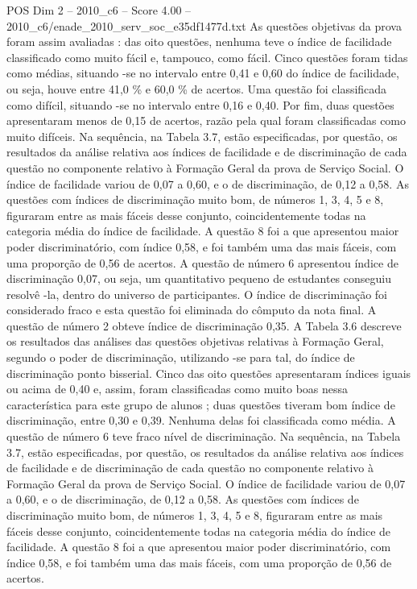 \begin{textsample}{POS Dim 2 – 2010\_c6 – Score 4.00 – 2010\_c6/enade\_2010\_serv\_soc\_e35df1477d.txt}
As questões objetivas da prova foram assim avaliadas : das oito questões, nenhuma teve o índice de facilidade classificado como muito fácil e, tampouco, como fácil.
Cinco questões foram tidas como médias, situando -se no intervalo entre 0,41 e 0,60 do índice de facilidade, ou seja, houve entre 41,0 \% e 60,0 \% de acertos.
Uma questão foi classificada como difícil, situando -se no intervalo entre 0,16 e 0,40.
Por fim, duas questões apresentaram menos de 0,15 de acertos, razão pela qual foram classificadas como muito difíceis.
Na sequência, na Tabela 3.7, estão especificadas, por questão, os resultados da análise relativa aos índices de facilidade e de discriminação de cada questão no componente relativo à Formação Geral da prova de Serviço Social.
O índice de facilidade variou de 0,07 a 0,60, e o de discriminação, de 0,12 a 0,58.
As questões com índices de discriminação muito bom, de números 1, 3, 4, 5 e 8, figuraram entre as mais fáceis desse conjunto, coincidentemente todas na categoria média do índice de facilidade.
A questão 8 foi a que apresentou maior poder discriminatório, com índice 0,58, e foi também uma das mais fáceis, com uma proporção de 0,56 de acertos.
A questão de número 6 apresentou índice de discriminação 0,07, ou seja, um quantitativo pequeno de estudantes conseguiu resolvê -la, dentro do universo de participantes.
O índice de discriminação foi considerado fraco e esta questão foi eliminada do cômputo da nota final.
A questão de número 2 obteve índice de discriminação 0,35.
A Tabela 3.6 descreve os resultados das análises das questões objetivas relativas à Formação Geral, segundo o poder de discriminação, utilizando -se para tal, do índice de discriminação ponto bisserial.
Cinco das oito questões apresentaram índices iguais ou acima de 0,40 e, assim, foram classificadas como muito boas nessa característica para este grupo de alunos ; duas questões tiveram bom índice de discriminação, entre 0,30 e 0,39.
Nenhuma delas foi classificada como média.
A questão de número 6 teve fraco nível de discriminação.
Na sequência, na Tabela 3.7, estão especificadas, por questão, os resultados da análise relativa aos índices de facilidade e de discriminação de cada questão no componente relativo à Formação Geral da prova de Serviço Social.
O índice de facilidade variou de 0,07 a 0,60, e o de discriminação, de 0,12 a 0,58.
As questões com índices de discriminação muito bom, de números 1, 3, 4, 5 e 8, figuraram entre as mais fáceis desse conjunto, coincidentemente todas na categoria média do índice de facilidade.
A questão 8 foi a que apresentou maior poder discriminatório, com índice 0,58, e foi também uma das mais fáceis, com uma proporção de 0,56 de acertos.

\end{textsample}
